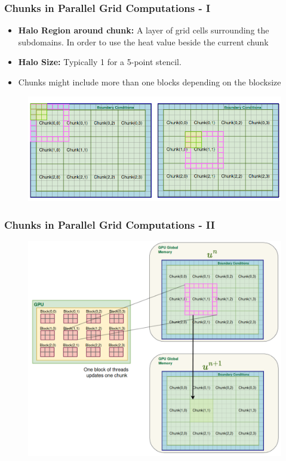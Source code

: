 \documentclass[9pt]{beamer}
\begin{document}
\begin{frame}
\frametitle{Chunks in Parallel Grid Computations - I}
\begin{itemize}
    \item \textbf{Halo Region around chunk:} A layer of grid cells surrounding the subdomains. In order to use the heat value beside the current chunk
    \item \textbf{Halo Size:} Typically 1 for a 5-point stencil.
    \item Chunks might include more than one blocks depending on the blocksize
\end{itemize}

\begin{figure}
    \centering
    \includegraphics[width=0.8\linewidth]{Screenshot from 2024-08-30 19-03-50.png}
    \label{fig:enter-label}
\end{figure}
\end{frame}




\begin{frame}
\frametitle{Chunks in Parallel Grid Computations - II}
\begin{figure}
    \centering
    \includegraphics[height=0.9\textheight]{Screenshot from 2024-10-01 12-51-51.png}
    \label{fig:enter-label}
\end{figure}
\end{frame}
\end{document}
